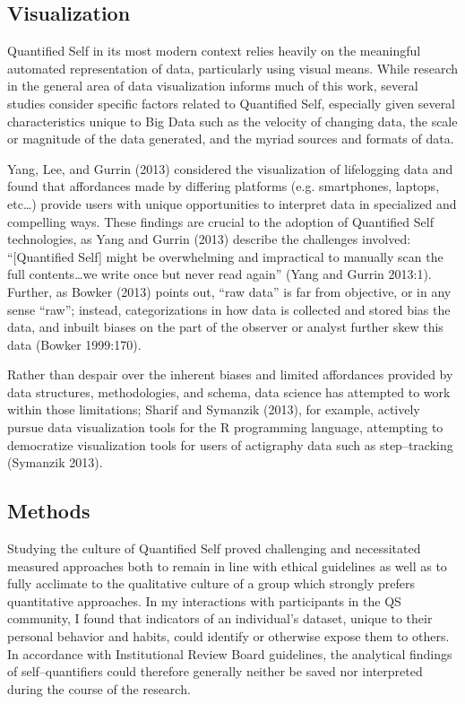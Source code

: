 \documentclass{article}
\begin{document}
\subsection*{Visualization}
Quantified Self in its most modern context relies heavily on the meaningful automated representation of data,
particularly using visual means.
While research in the general area of data visualization informs much of this work,
several studies consider specific factors related to Quantified Self,
especially given several characteristics unique to Big Data such as the velocity of changing data,
the scale or magnitude of the data generated,
and the myriad sources and formats of data.

Yang,
Lee,
and Gurrin (2013) considered the visualization of lifelogging data and found that affordances made by differing platforms (e.g.
smartphones,
laptops,
etc\dots) provide users with unique opportunities to interpret data in specialized and compelling ways.
These findings are crucial to the adoption of Quantified Self technologies,
as Yang and Gurrin (2013) describe the challenges involved:
``[Quantified Self] might be overwhelming and impractical to manually scan the full contents\dots we write once but never read again''
(Yang and Gurrin 2013:1).
Further,
as Bowker (2013) points out,
``raw data'' is far from objective,
or in any sense ``raw'';
instead,
categorizations in how data is collected and stored bias the data,
and inbuilt biases on the part of the observer or analyst further skew this data
(Bowker 1999:170).

Rather than despair over the inherent biases and limited affordances provided by data structures,
methodologies,
and schema,
data science has attempted to work within those limitations;
Sharif and Symanzik (2013),
for example,
actively pursue data visualization tools for the R programming language,
attempting to democratize visualization tools for users of actigraphy data such as step--tracking
(Symanzik 2013).

\subsection*{Methods}
Studying the culture of Quantified Self proved challenging and necessitated measured approaches both to remain in line with ethical guidelines as well as to fully acclimate to the qualitative culture of a group which strongly prefers quantitative approaches.
In my interactions with participants in the QS community,
I found that indicators of an individual's dataset,
unique to their personal behavior and habits,
could identify or otherwise expose them to others.
In accordance with Institutional Review Board guidelines,
the analytical findings of self--quantifiers could therefore generally neither be saved nor interpreted during the course of the research.
\end{document}

